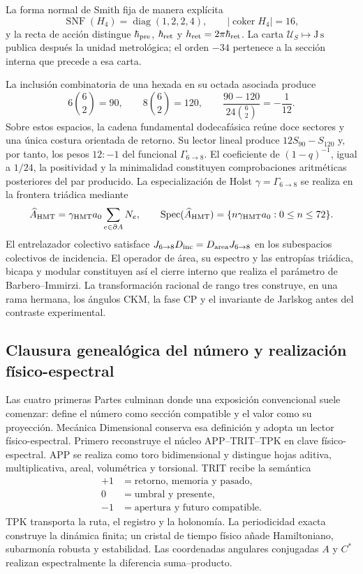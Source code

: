 La forma normal de Smith fija de manera explícita
\[
 \operatorname{SNF}(H_4)=\operatorname{diag}(1,2,2,4),
 \qquad |\operatorname{coker}H_4|=16,
\]
y la recta de acción distingue
\(\hbar_{\rm pre}\), \(\hbar_{\rm ret}\) y
\(h_{\rm ret}=2\pi\hbar_{\rm ret}\). La carta
\(\mathcal U_S\mapsto\mathrm{J\,s}\) publica después la unidad
metrológica; el orden \(-34\) pertenece a la sección interna que precede a
esa carta.

La inclusión combinatoria de una hexada en su octada asociada produce
\[
 6\binom62=90,\qquad
 8\binom62=120,
 \qquad
 \frac{90-120}{24\binom62}=-\frac1{12}.
\]
Sobre estos espacios, la cadena fundamental dodecafásica reúne doce sectores
y una única costura orientada de retorno. Su lector lineal produce
\(12S_{90}-S_{120}\) y, por tanto, los pesos \(12:-1\) del funcional
\(\Gamma_{6\to8}\). El coeficiente de \((1-q)^{-1}\), igual a \(1/24\),
la positividad y la minimalidad constituyen comprobaciones aritméticas
posteriores del par producido. La especialización de Holst
\(\gamma=\Gamma_{6\to8}\) se realiza en la frontera triádica mediante
\[
 \widehat A_{\rm HMT}
 =\gamma_{\rm HMT}a_0\sum_{e\in\partial A}N_e,
 \qquad
 \operatorname{Spec}(\widehat A_{\rm HMT})
 =\{n\gamma_{\rm HMT}a_0:0\le n\le72\}.
\]
El entrelazador colectivo satisface
\(J_{6\to8}D_{\rm inc}=D_{\rm area}J_{6\to8}\) en los subespacios
colectivos de incidencia. El operador de área, su espectro y las entropías
triádica, bicapa y modular constituyen así el cierre interno que realiza el
parámetro de Barbero--Immirzi. La transformación racional de rango tres
construye, en una rama hermana, los ángulos CKM, la fase CP y el invariante
de Jarlskog antes del contraste experimental.

\subsection*{Clausura genealógica del número y realización físico-espectral}

Las cuatro primeras Partes culminan donde una exposición convencional suele comenzar:
define el número como sección compatible y el valor como su proyección.
Mecánica Dimensional conserva esa definición y adopta un lector
físico-espectral. Primero
reconstruye el núcleo APP--TRIT--TPK en clave físico-espectral. APP se realiza
como toro bidimensional y distingue hojas aditiva, multiplicativa, areal,
volumétrica y torsional. TRIT recibe la semántica
\[
 \begin{aligned}
 +1&=\text{retorno, memoria y pasado},\\
 0&=\text{umbral y presente},\\
 -1&=\text{apertura y futuro compatible}.
 \end{aligned}
\]
TPK transporta la ruta, el registro y la holonomía. La periodicidad exacta
construye la dinámica finita; un cristal de tiempo físico añade Hamiltoniano,
subarmonía robusta y estabilidad. Las coordenadas angulares conjugadas
\(A\) y \(C^*\) realizan espectralmente la diferencia suma--producto.

